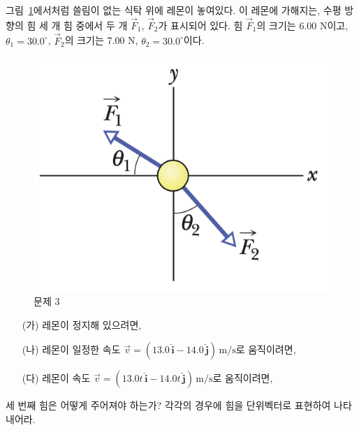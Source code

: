 \documentclass[floatfix,nofootinbib,superscriptaddress,fleqn,preprint]{revtex4}
\begin{document}
 그림~\ref{fig:3}에서처럼 쓸림이 없는 식탁 위에 레몬이 놓여있다. 이
 레몬에 가해지는, 수평 방향의 힘 세 개 힘 중에서  두 개 $\vec{F}_1$,
 $\vec{F}_2$가 표시되어 있다. 힘 $\vec{F}_1$의 크기는 6.00 N이고,
$\theta_1=30.0^\circ$, $\vec{F}_2$의 크기는 7.00 N,
$\theta_2=30.0^\circ$이다. 
\begin{figure}[ht]
  \centering
\includegraphics[scale=0.6]{Qfig6-3-20220316.png}  
  \caption{문제 3}
  \label{fig:3}
\end{figure}
\begin{itemize}
\item[(가)] 레몬이 정지해 있으려면,
\item[(나)] 레몬이 일정한 속도 $\vec{v} =(13.0\,\hat{\bm{i}} -
  14.0\,\hat{\bm{j}})\,\mathrm{m/s}$로 움직이려면, 
\item[(다)] 레몬이 속도 $\vec{v} =(13.0t\,\hat{\bm{i}} -
  14.0t\,\hat{\bm{j}})\,\mathrm{m/s}$로 움직이려면, 
\end{itemize}
세 번째 힘은 어떻게 주어져야 하는가? 각각의 경우에 힘을 단위벡터로
표현하여 나타내어라. 
\end{document}
